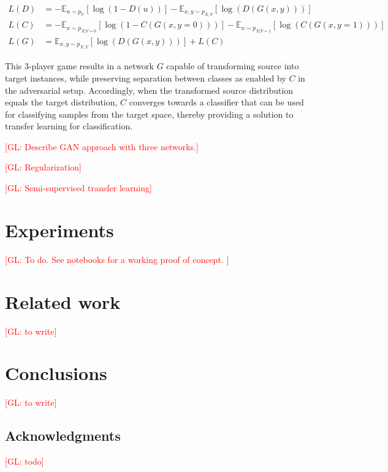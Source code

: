 \documentclass{article}
\newcommand{\glnote}[1]{\textcolor{red}{[GL: #1]}}
\theoremstyle{plain}
\begin{document}
\begin{align}
    L(D) &= -\mathbb{E}_{u \sim p_U} [\log(1 - D(u))] -\mathbb{E}_{x,y \sim p_{X,Y}} [\log(D(G(x, y)))] \\
    L(C) &= -\mathbb{E}_{x \sim p_{X|Y=0}} [\log(1 - C(G(x, y=0)))] -\mathbb{E}_{x \sim p_{X|Y=1}} [\log(C(G(x, y=1)))] \\
    L(G) &= \mathbb{E}_{x,y \sim p_{X,Y}} [\log(D(G(x, y)))] + L(C)
\end{align}

This 3-player game results in a network $G$
capable of transforming source into target instances, while preserving
separation between classes as enabled by $C$ in the adversarial setup.
Accordingly, when the transformed source distribution equals the
target distribution, $C$ converges towards a classifier that can be used
for classifying samples from the target space, thereby providing a solution
to transfer learning for classification.  


\glnote{Describe GAN approach with three networks.}

\glnote{Regularization}

\glnote{Semi-supervised transfer learning}

\section{Experiments}

\glnote{To do. See notebooks for a working proof of concept. }


\section{Related work}

\glnote{to write}


\section{Conclusions}

\glnote{to write}

\subsection*{Acknowledgments}

\glnote{todo}



\end{document}
